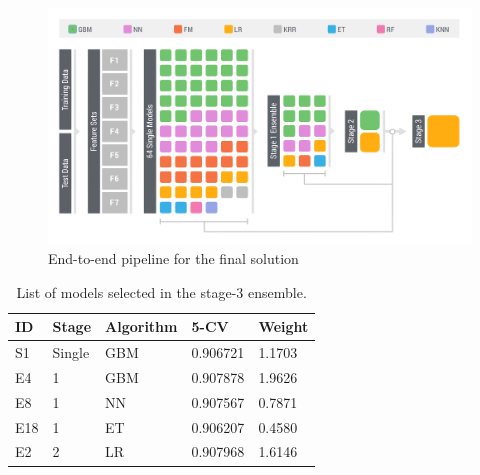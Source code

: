 \begin{figure}[!t]
  \caption{End-to-end pipeline for the final solution}
  \centering
    \includegraphics[width=1 \textwidth]{ensemble}
\end{figure}

\begin{table}
\begin{center}
\begin{tabular}{lllll}
ID 	& Stage 	& Algorithm 	& 5-CV 		& Weight\\ \hline
S1 	& Single	& GBM		& 0.906721 	& 1.1703 \\
E4 	& 1 		& GBM		& 0.907878 	& 1.9626\\
E8 	& 1 		& NN		& 0.907567	& 0.7871\\
E18	& 1		& ET			& 0.906207 	& 0.4580\\
E2	& 2 		& LR			& 0.907968 	& 1.6146\\
\end{tabular}
\caption{List of models selected in the stage-3 ensemble.}
\label{tb:finalEnsemble}
\end{center}
\end{table}

